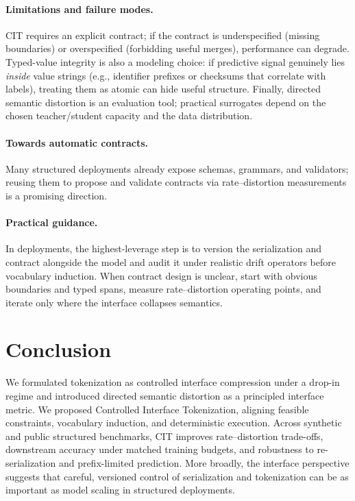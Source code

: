 \paragraph{Limitations and failure modes.}
CIT requires an explicit contract; if the contract is underspecified (missing boundaries) or overspecified (forbidding useful merges), performance can degrade.
Typed-value integrity is also a modeling choice: if predictive signal genuinely lies \emph{inside} value strings (e.g., identifier prefixes or checksums that correlate with labels), treating them as atomic can hide useful structure.
Finally, directed semantic distortion is an evaluation tool; practical surrogates depend on the chosen teacher/student capacity and the data distribution.

\paragraph{Towards automatic contracts.}
Many structured deployments already expose schemas, grammars, and validators; reusing them to propose and validate contracts via rate--distortion measurements is a promising direction.

\paragraph{Practical guidance.}
In deployments, the highest-leverage step is to version the serialization and contract alongside the model and audit it under realistic drift operators before vocabulary induction.
When contract design is unclear, start with obvious boundaries and typed spans, measure rate--distortion operating points, and iterate only where the interface collapses semantics.


\section{Conclusion}
\label{sec:conclusion}

We formulated tokenization as controlled interface compression under a drop-in regime and introduced directed semantic distortion as a principled interface metric.
We proposed Controlled Interface Tokenization, aligning feasible constraints, vocabulary induction, and deterministic execution.
Across synthetic and public structured benchmarks, CIT improves rate--distortion trade-offs, downstream accuracy under matched training budgets, and robustness to re-serialization and prefix-limited prediction.
More broadly, the interface perspective suggests that careful, versioned control of serialization and tokenization can be as important as model scaling in structured deployments.
